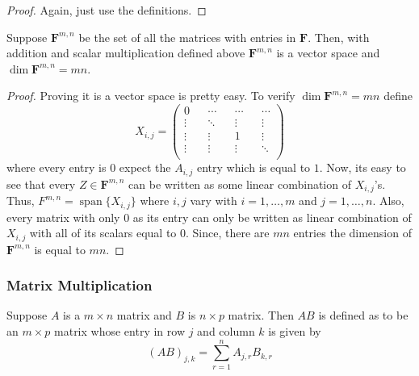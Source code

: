 \begin{proof}
    Again, just use the definitions.
\end{proof}

\begin{theorem}
    Suppose $\mathbf{F}^{m,n}$ be the set of all the matrices with entries in $\mathbf{F}$. Then, with addition and scalar multiplication
    defined above $\mathbf{F}^{m,n}$ is a vector space and $\dim \mathbf{F}^{m,n} = mn$. 
\end{theorem}

\begin{proof}
    Proving it is a vector space is pretty easy. To verify $\dim \mathbf{F}^{m,n}=mn$ define
    \[ X_{i,j} = \begin{pmatrix}
        0 && \cdots && \cdots && \cdots  \\
        \vdots && \ddots && \vdots && \vdots \\
        \vdots && \vdots && 1 && \vdots \\
        \vdots && \vdots && \vdots && \ddots \\
    \end{pmatrix} \]    
    where every entry is $0$ expect the $A_{i,j}$ entry which is equal to $1$. Now, its easy to see that every $Z \in \mathbf{F}^{m,n}$
    can be written as some linear combination of $X_{i,j}$'s. Thus, $F^{m,n}= \operatorname{span}\{X_{i,j}\}$ where $i,j$ vary with 
    $i=1,\ldots,m$ and $j=1,\ldots,n$. Also, every matrix with only $0$ as its entry can only be written as linear combination of $X_{i,j}$
    with all of its scalars equal to $0$. Since, there are $mn$ entries the dimension of $\mathbf{F}^{m,n}$ is equal to $mn$. 
\end{proof}

\subsubsection{Matrix Multiplication}

\begin{definition}
    Suppose $A$ is a $m \times n$ matrix and $B$ is $n \times p$ matrix. Then $AB$ is defined as to be an $m \times p$ matrix whose 
    entry in row $j$ and column $k$ is given by
    \[ (AB)_{j,k} = \sum_{r=1}^{n} A_{j,r} B_{k,r} \]
\end{definition}

